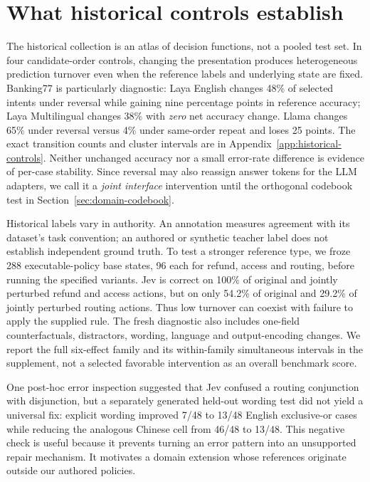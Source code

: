 \section{What historical controls establish}
\label{sec:historical}
The historical collection is an atlas of decision functions, not a pooled test set. In four candidate-order controls, changing the presentation produces heterogeneous prediction turnover even when the reference labels and underlying state are fixed. Banking77 is particularly diagnostic: Laya English changes 48\% of selected intents under reversal while gaining nine percentage points in reference accuracy; Laya Multilingual changes 38\% with \emph{zero} net accuracy change. Llama changes 65\% under reversal versus 4\% under same-order repeat and loses 25 points. The exact transition counts and cluster intervals are in Appendix~\ref{app:historical-controls}. Neither unchanged accuracy nor a small error-rate difference is evidence of per-case stability. Since reversal may also reassign answer tokens for the LLM adapters, we call it a \emph{joint interface} intervention until the orthogonal codebook test in Section~\ref{sec:domain-codebook}.

Historical labels vary in authority. An annotation measures agreement with its dataset's task convention; an authored or synthetic teacher label does not establish independent ground truth. To test a stronger reference type, we froze 288 executable-policy base states, 96 each for refund, access and routing, before running the specified variants. Jev is correct on 100\% of original and jointly perturbed refund and access actions, but on only 54.2\% of original and 29.2\% of jointly perturbed routing actions. Thus low turnover can coexist with failure to apply the supplied rule. The fresh diagnostic also includes one-field counterfactuals, distractors, wording, language and output-encoding changes. We report the full six-effect family and its within-family simultaneous intervals in the supplement, not a selected favorable intervention as an overall benchmark score.

One post-hoc error inspection suggested that Jev confused a routing conjunction with disjunction, but a separately generated held-out wording test did not yield a universal fix: explicit wording improved 7/48 to 13/48 English exclusive-or cases while reducing the analogous Chinese cell from 46/48 to 13/48. This negative check is useful because it prevents turning an error pattern into an unsupported repair mechanism. It motivates a domain extension whose references originate outside our authored policies.
